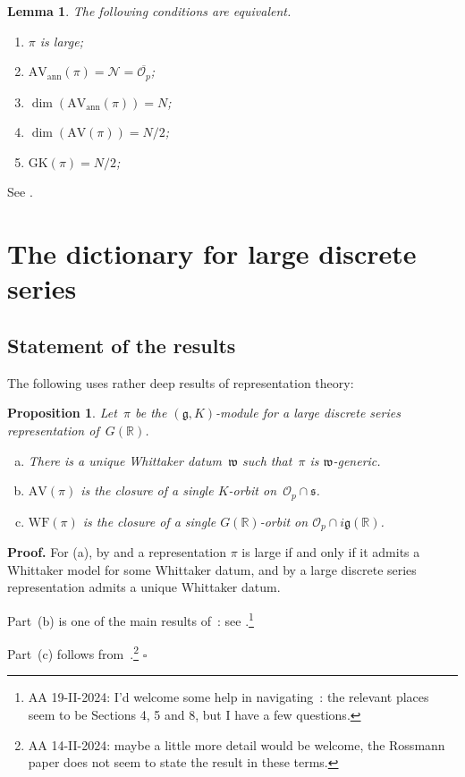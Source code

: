 \documentclass[10pt,leqno]{article}
\newtheorem{lemma}[equation]{Lemma}
\newtheorem{proposition}[equation]{Proposition}
\newcommand{\qed}{\hfill $\square$ \medskip}
\newenvironment{proof}[1][Proof]{\noindent\textbf{#1.} }{\qed}
\renewcommand{\O}{\mathcal O}
\newcommand{\R}{\mathbb R}
\newcommand{\N}{\mathcal N}
\newcommand{\g}{\mathfrak g}
\newcommand{\AV}{\mathrm{AV}}
\newcommand{\WF}{\mathrm{WF}}
\newcommand{\AVann}{\mathrm{AV}_{\mathrm{ann}}}
\newcommand{\GK}{\mathrm{GK}}
\newcommand{\Op}{\O_p}
\begin{document}
\begin{lemma}
  \label{l:large}
  The following conditions are equivalent.
  \begin{enumerate}
    \item $\pi$ is large;
\item $\AVann(\pi)=\N=\overline{\Op}$;
\item $\dim(\AVann(\pi))=N$;
  \item $\dim(\AV(\pi))=N/2$;
\item $\GK(\pi)=N/2$;

\end{enumerate}
\end{lemma}
See \cite{vogan_bowdoin}.


\section{The dictionary for large discrete series}


\subsection{Statement of the results}  


The following uses rather deep results of representation theory:
\begin{proposition} Let~$\pi$ be the $(\g, K)$-module for a large discrete series representation of~$G(\R)$.  
\begin{enumerate}[(a)]
\item There is a unique Whittaker datum~$\mathfrak{w}$ such that~$\pi$ is $\mathfrak{w}$-generic.
\item $\AV(\pi)$ is the closure of a single $K$-orbit on~$\mathcal{O}_p \cap \mathfrak{s}$.
\item  $\WF(\pi)$ is the closure of a single $G(\R)$-orbit on $\mathcal{O}_p \cap  i \g(\R)$.
\end{enumerate}
\end{proposition}

\begin{proof} For (a), by \cite{vogan-gelfand-kirillov} and \cite{kostant_whittaker}
a representation $\pi$ is large if and only if it admits a Whittaker model for some Whittaker datum,
and by \cite[Lemma 14.14]{abv} a  large discrete series representation admits a unique Whittaker datum.

Part~(b) is one of the main results of~\cite{vogan_bowdoin}: see \cite[Theorem ?]{vogan_bowdoin}.\footnote{AA 19-II-2024: I'd welcome some help in navigating~\cite{vogan_bowdoin}: the relevant places seem to be  Sections 4, 5 and 8, but I have a few questions.}

Part~(c) follows from~\cite{rossmann_limit_orbits}.\footnote{AA 14-II-2024: maybe a little more detail would be welcome, the Rossmann paper does not seem to state the result in these terms.}
\end{proof}
\end{document}

